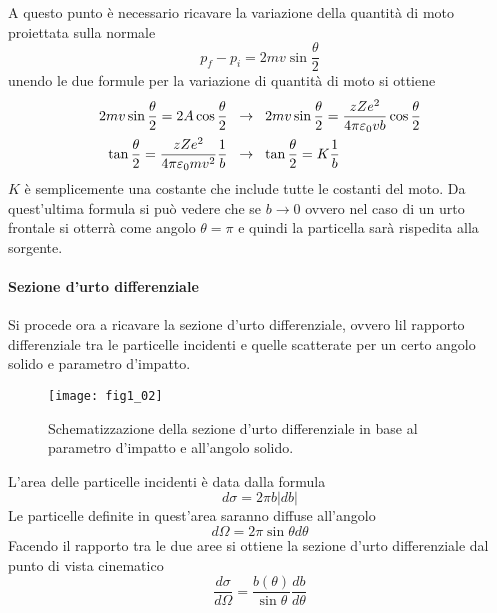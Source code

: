 A questo punto è necessario ricavare la variazione della quantità di moto proiettata sulla normale
\begin{equation}
p_f-p_i=2mv\sin\frac{\theta}{2}
\end{equation}
unendo le due formule per la variazione di quantità di moto si ottiene
\begin{equation}
\begin{split}
2mv\sin\frac{\theta}{2}=2A\cos\frac{\theta}{2} \hspace{0.2cm} & \to \hspace{0.2cm} 2mv\sin\frac{\theta}{2}=\frac{zZe^2}{4\pi \varepsilon_0vb}\cos\frac{\theta}{2}\\
\tan\frac{\theta}{2}=\frac{zZe^2}{4\pi\varepsilon_0mv^2}\frac{1}{b} \hspace{0.2cm} & \to\hspace{0.2cm} \tan\frac{\theta}{2}=K\frac{1}{b}
\end{split}
\end{equation}
$K$ è semplicemente una costante che include tutte le costanti del moto.
Da quest'ultima formula si può vedere che se $b\to 0$ ovvero nel caso di un urto frontale si otterrà come angolo $\theta=\pi$ e quindi la particella sarà rispedita alla sorgente.

\paragraph{Sezione d'urto differenziale}

Si procede ora a ricavare la sezione d'urto differenziale, ovvero lil rapporto differenziale tra le particelle incidenti e quelle scatterate per un certo angolo solido e parametro d'impatto. 
\begin{figure}[h]
\centering
\texttt{[image: fig1\_02]}
\caption{Schematizzazione della sezione d'urto differenziale in base al parametro d'impatto e all'angolo solido.}
\label{fig:1.2}
\end{figure}

L'area delle particelle incidenti è data dalla formula 
\begin{equation}
d\sigma=2\pi b |db|
\end{equation}
Le particelle definite in quest'area saranno diffuse all'angolo 
\begin{equation}
d\Omega =2\pi \sin\theta d\theta
\end{equation}
Facendo il rapporto tra le due aree si ottiene la sezione d'urto differenziale dal punto di vista cinematico
\begin{equation}
\frac{d\sigma}{d\Omega}=\frac{b(\theta)}{\sin\theta}\frac{db}{d\theta}
\end{equation}

